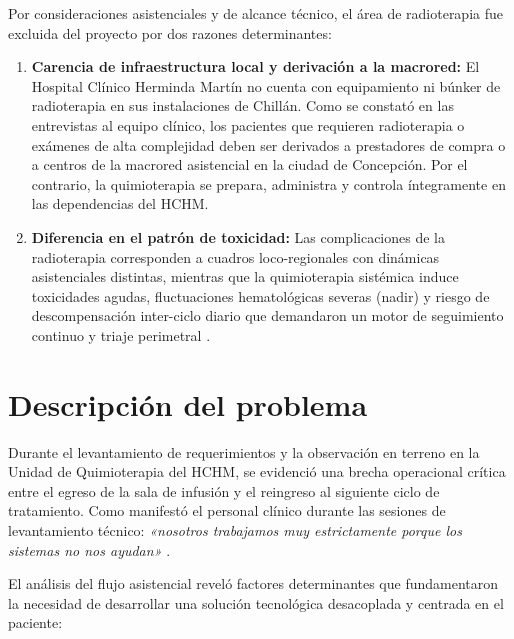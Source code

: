 Por consideraciones asistenciales y de alcance técnico, el área de radioterapia fue excluida del proyecto por dos razones determinantes:
\begin{enumerate}
    \item \textbf{Carencia de infraestructura local y derivación a la macrored:} El Hospital Clínico Herminda Martín no cuenta con equipamiento ni búnker de radioterapia en sus instalaciones de Chillán. Como se constató en las entrevistas al equipo clínico, los pacientes que requieren radioterapia o exámenes de alta complejidad deben ser derivados a prestadores de compra o a centros de la macrored asistencial en la ciudad de Concepción. Por el contrario, la quimioterapia se prepara, administra y controla íntegramente en las dependencias del HCHM.
    \item \textbf{Diferencia en el patrón de toxicidad:} Las complicaciones de la radioterapia corresponden a cuadros loco-regionales con dinámicas asistenciales distintas, mientras que la quimioterapia sistémica induce toxicidades agudas, fluctuaciones hematológicas severas (nadir) y riesgo de descompensación inter-ciclo diario que demandaron un motor de seguimiento continuo y triaje perimetral \parencite{minsal2022plancancer}.
\end{enumerate}

\section{Descripción del problema}
Durante el levantamiento de requerimientos y la observación en terreno en la Unidad de Quimioterapia del HCHM, se evidenció una brecha operacional crítica entre el egreso de la sala de infusión y el reingreso al siguiente ciclo de tratamiento. Como manifestó el personal clínico durante las sesiones de levantamiento técnico: \textit{«nosotros trabajamos muy estrictamente porque los sistemas no nos ayudan»} \parencite{entrevistaHCHM2026}.

El análisis del flujo asistencial reveló factores determinantes que fundamentaron la necesidad de desarrollar una solución tecnológica desacoplada y centrada en el paciente:

